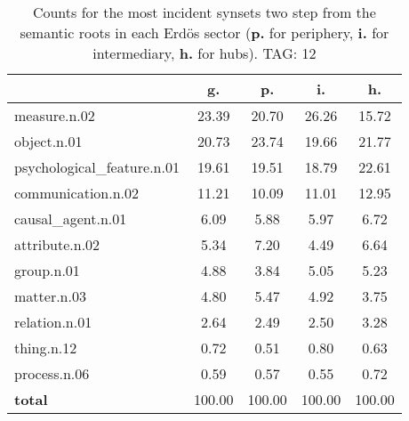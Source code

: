 \begin{table}[h!]
\begin{center}
\begin{tabular}{| l | c | c | c | c |}\hline
 & g. & p. & i. & h. \\\hline
measure.n.02 & 23.39  & 20.70  & 26.26  & 15.72 \\\hline
object.n.01 & 20.73  & 23.74  & 19.66  & 21.77 \\\hline
psychological\_feature.n.01 & 19.61  & 19.51  & 18.79  & 22.61 \\\hline
communication.n.02 & 11.21  & 10.09  & 11.01  & 12.95 \\\hline
causal\_agent.n.01 & 6.09  & 5.88  & 5.97  & 6.72 \\\hline
attribute.n.02 & 5.34  & 7.20  & 4.49  & 6.64 \\\hline
group.n.01 & 4.88  & 3.84  & 5.05  & 5.23 \\\hline
matter.n.03 & 4.80  & 5.47  & 4.92  & 3.75 \\\hline
relation.n.01 & 2.64  & 2.49  & 2.50  & 3.28 \\\hline
thing.n.12 & 0.72  & 0.51  & 0.80  & 0.63 \\\hline
process.n.06 & 0.59  & 0.57  & 0.55  & 0.72 \\\hline
{{\bf total}} & 100.00  & 100.00  & 100.00  & 100.00 \\\hline
\end{tabular}
\caption{Counts for the most incident synsets two step from the semantic roots in each Erd\"os sector ({\bf p.} for periphery, {\bf i.} for intermediary, {\bf h.} for hubs). TAG: 12}
\end{center}
\end{table}